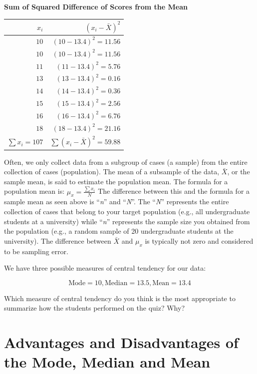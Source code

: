 \documentclass[
  letterpaper,
  DIV=11,
  numbers=noendperiod]{scrreprt}
\begin{document}
\begin{enumerate}
  \textbf{Sum of Squared Difference of Scores from the Mean}

  \begin{longtable}[]{@{}rr@{}}
  \toprule\noalign{}
  \(x_i\) & \((x_i - \bar{X})^2\) \\
  \midrule\noalign{}
  \endhead
  \bottomrule\noalign{}
  \endlastfoot
  \(10\) & \((10 - 13.4)^2 = 11.56\) \\
  \(10\) & \((10 - 13.4)^2 = 11.56\) \\
  \(11\) & \((11 - 13.4)^2 = 5.76\) \\
  \(13\) & \((13 - 13.4)^2 = 0.16\) \\
  \(14\) & \((14 - 13.4)^2 = 0.36\) \\
  \(15\) & \((15 - 13.4)^2 = 2.56\) \\
  \(16\) & \((16 - 13.4)^2 = 6.76\) \\
  \(18\) & \((18 - 13.4)^2 = 21.16\) \\
  \textbf{\(\sum x_i = 107\)} &
  \textbf{\(\sum (x_i - \bar{X})^2 = 59.88\)} \\
  \end{longtable}
\end{enumerate}

Often, we only collect data from a subgroup of cases (a sample) from the
entire collection of cases (population). The mean of a subsample of the
data, \(\bar{X}\), or the sample mean, is said to estimate the
population mean. The formula for a population mean is:
\(\mu_x = \frac{\sum x_i}{N}\) The difference between this and the
formula for a sample mean as seen above is ``\emph{n}'' and
``\emph{N}''. The ``\emph{N}'' represents the entire collection of cases
that belong to your target population (e.g., all undergraduate students
at a university) while ``\emph{n}'' represents the sample size you
obtained from the population (e.g., a random sample of 20 undergraduate
students at the university). The difference between \(\bar{X}\) and
\(\mu_x\) is typically not zero and considered to be sampling error.

We have three possible measures of central tendency for our data:

\[
\text{Mode} = 10,  \text{Median} = 13.5,  \text{Mean} = 13.4
\]

Which measure of central tendency do you think is the most appropriate
to summarize how the students performed on the quiz? Why?

\section{Advantages and Disadvantages of the Mode, Median and
Mean}\label{advantages-and-disadvantages-of-the-mode-median-and-mean}
\end{document}
